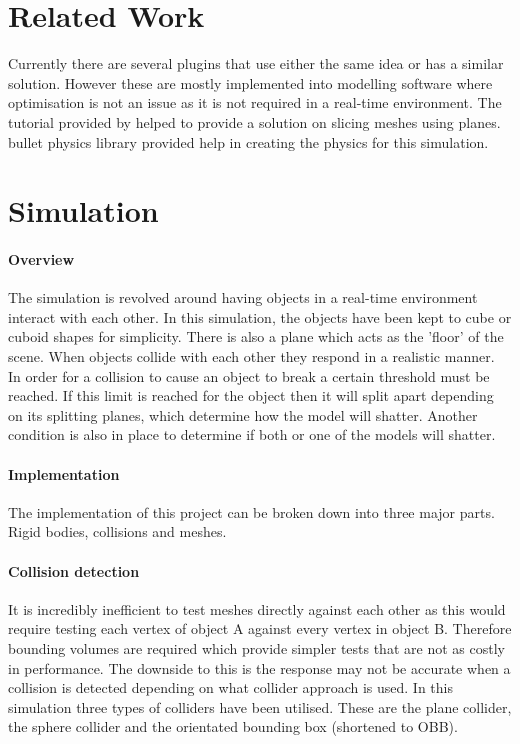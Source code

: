 \documentclass[conference,backref=page]{acmsiggraph}
\begin{document}
\section{Related Work}

Currently there are several plugins that use either the same idea or has a similar solution. However these are mostly implemented into modelling software where optimisation is not an issue as it is not required in a real-time environment. The tutorial provided by \cite{voronoiShattering} helped to provide a solution on slicing meshes using planes. \cite{Physics} bullet physics library provided help in creating the physics for this simulation. 

\section{Simulation}

\paragraph{Overview} \hfill

The simulation is revolved around having objects in a real-time environment interact with each other. In this simulation, the objects have been kept to cube or cuboid shapes for simplicity. There is also a plane which acts as the 'floor' of the scene. When objects collide with each other they respond in a realistic manner. In order for a collision to cause an object to break a certain threshold must be reached. If this limit is reached for the object then it will split apart depending on its splitting planes, which determine how the model will shatter. Another condition is also in place to determine if both or one of the models will shatter.

\paragraph{Implementation} \hfill

The implementation of this project can be broken down into three major parts. Rigid bodies, collisions and meshes.

\paragraph {Collision detection} \hfill

It is incredibly inefficient to test meshes directly against each other as this would require testing each vertex of object A against every vertex in object B. Therefore bounding volumes are required which provide simpler tests that are not as costly in performance. The downside to this is the response may not be accurate when a collision is detected depending on what collider approach is used. In this simulation three types of colliders have been utilised. These are the plane collider, the sphere collider and the orientated bounding box (shortened to OBB). 
\end{document}
